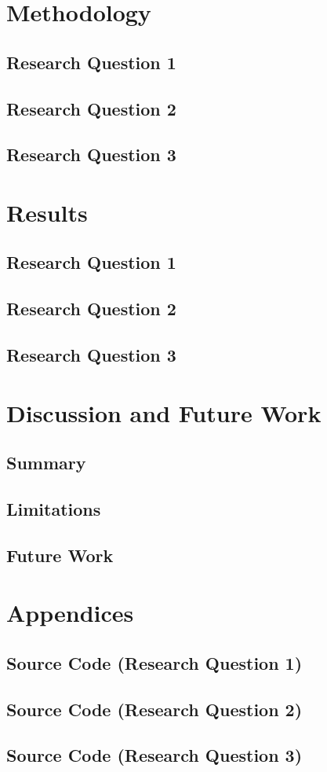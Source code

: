 \documentclass[12pt,bibliography=totocnumbered]{scrartcl}
\begin{document}
\section{Methodology}
\subsection{Research Question 1}
\subsection{Research Question 2}
\subsection{Research Question 3}

\section{Results}
\subsection{Research Question 1}
\subsection{Research Question 2}
\subsection{Research Question 3}

\section{Discussion and Future Work}
\subsection{Summary}
\subsection{Limitations}
\subsection{Future Work}
\printbibliography

\section{Appendices}


\subsection{Source Code (Research Question 1)}\label{appendix:srca}

\subsection{Source Code (Research Question 2)}\label{appendix:srcb}

\subsection{Source Code (Research Question 3)}\label{appendix:srcc}
\end{document}
